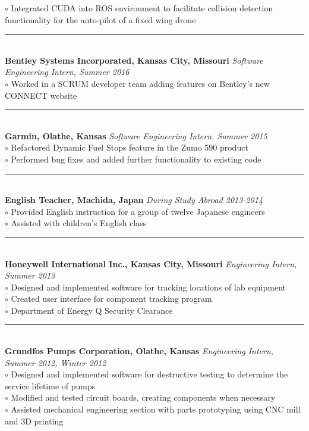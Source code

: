 \documentclass[twoside]{article}
\begin{document}
\begin{adjustwidth}{0.2in}{0in}
$\circ$ Integrated CUDA into ROS environment to facilitate collision detection functionality for the auto-pilot of a fixed wing drone\\
\rule{7.3in}{0.5pt}\\
\textbf{Bentley Systems Incorporated, Kansas City, Missouri} \hfill \textit{Software Engineering Intern, Summer 2016}\\
$\circ$ Worked in a SCRUM developer team adding features on Bentley's new CONNECT website\\
\rule{7.3in}{0.5pt}\\
\textbf{Garmin, Olathe, Kansas} \hfill \textit{Software Engineering Intern, Summer 2015}\\
$\circ$ Refactored Dynamic Fuel Stops feature in the Zumo 590 product\\
$\circ$ Performed bug fixes and added further functionality to existing code\\
\rule{7.3in}{0.5pt}\\
\textbf{English Teacher, Machida, Japan} \hfill \textit{During Study Abroad 2013-2014}\\
$\circ$ Provided English instruction for a group of twelve Japanese engineers\\
$\circ$ Assisted with children's English class\\
\rule{7.3in}{0.5pt}\\
\textbf{Honeywell International Inc., Kansas City, Missouri} \hfill \textit{Engineering Intern, Summer 2013}\\
$\circ$ Designed and implemented software for tracking locations of lab equipment\\
$\circ$ Created user interface for component tracking program\\
$\circ$ Department of Energy Q Security Clearance\\
\rule{7.3in}{0.5pt}\\
\textbf{Grundfos Pumps Corporation, Olathe, Kansas} \hfill \textit{Engineering Intern, Summer 2012, Winter 2012}\\
$\circ$ Designed and implemented software for destructive testing to determine the service lifetime of pumps\\
$\circ$ Modified and tested circuit boards, creating components when necessary\\
$\circ$ Assisted mechanical engineering section with parts prototyping using CNC mill and 3D printing\\
\end{adjustwidth}
\end{document}
